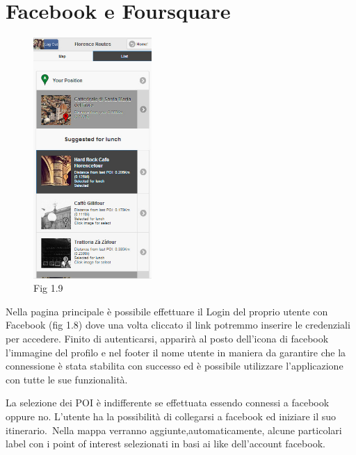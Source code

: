 \section{Facebook e Foursquare}
\begin{figure}
  \vspace{-20pt}
  \begin{center}
   
\includegraphics[width=0.40\textwidth]{img/fig1-9}
  \end{center}
  \vspace{-20pt}
  \caption*{Fig 1.9}
  \vspace{-10pt}
\end{figure}
Nella pagina principale è possibile effettuare il Login del proprio utente con Facebook (fig 1.8) dove una volta cliccato il link potremmo inserire le credenziali per accedere. Finito di autenticarsi, apparirà al posto dell'icona di facebook l'immagine del profilo e nel footer il nome utente in maniera da garantire che la connessione è stata stabilita con successo ed è possibile utilizzare l'applicazione con tutte le sue funzionalità.\

La selezione dei POI è indifferente se effettuata essendo connessi a facebook oppure no. 
L'utente ha la possibilità di collegarsi a facebook ed iniziare il suo itinerario.\
Nella mappa verranno aggiunte,automaticamente, alcune particolari label con i point of interest selezionati in basi ai like dell'account facebook.\

